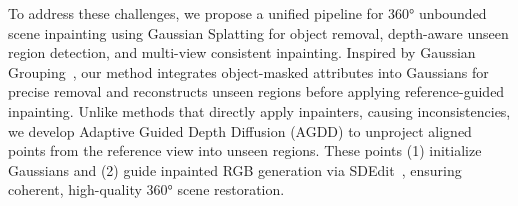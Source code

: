 To address these challenges, we propose a unified pipeline for 360° unbounded scene inpainting using Gaussian Splatting for object removal, depth-aware unseen region detection, and multi-view consistent inpainting. Inspired by Gaussian Grouping~\cite{ye2023gaussian}, our method integrates object-masked attributes into Gaussians for precise removal and reconstructs unseen regions before applying reference-guided inpainting. Unlike methods that directly apply inpainters, causing inconsistencies, we develop Adaptive Guided Depth Diffusion (AGDD) to unproject aligned points from the reference view into unseen regions. These points (1) initialize Gaussians and (2) guide inpainted RGB generation via SDEdit~\cite{meng2022sdedit}, ensuring coherent, high-quality 360° scene restoration.

